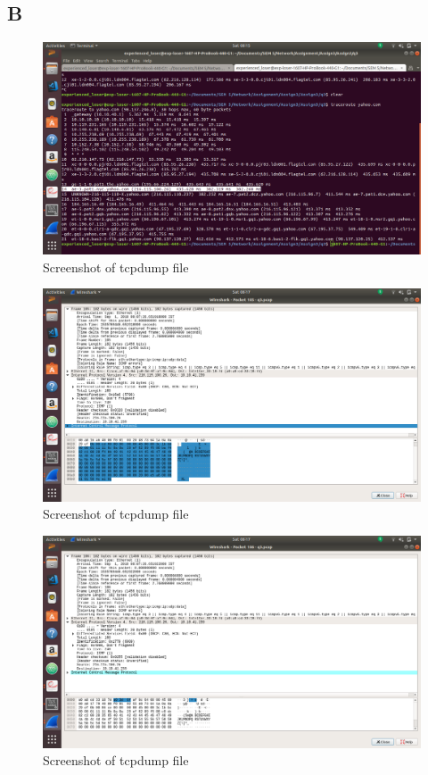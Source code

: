 \documentclass{article}
\begin{document}
\subsection{B}
   \begin{figure}[H]
 \centering
 \includegraphics[width=1.0\textwidth]{Assign3/q3/q32.png}
 \caption{\label{fig:PING}Screenshot of tcpdump file}
 \end{figure}
    
    \begin{figure}[H]
 \centering
 \includegraphics[width=1.0\textwidth]{Assign3/q3/q32a.png}
 \caption{\label{fig:PING}Screenshot of tcpdump file}
 \end{figure}
 
    \begin{figure}[H]
 \centering
 \includegraphics[width=1.0\textwidth]{Assign3/q3/q32b.png}
 \caption{\label{fig:PING}Screenshot of tcpdump file}
 \end{figure}
 
\end{document}
